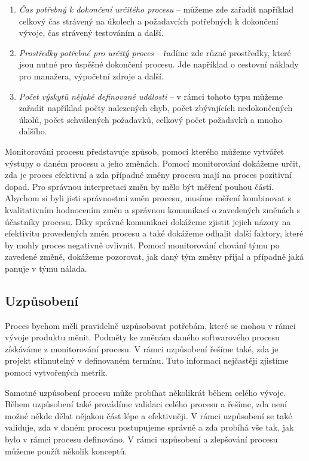 \documentclass[czech,master,public,dept460,male,cpdeclaration,oneside]{diploma}
\begin{document}
\begin{enumerate}
\item \textit{Čas potřebný k dokončení určitého procesu} -- můžeme zde zařadit například celkový čas strávený na úkolech a požadavcích potřebných k dokončení vývoje, čas strávený testováním a další.

\item \textit{Prostředky potřebné pro určitý proces} -- řadíme zde různé prostředky, které jsou nutné pro úspěšné dokončení procesu. Jde například o cestovní náklady pro manažera, výpočetní zdroje a další.

\item \textit{Počet výskytů nějaké definované události} -- v rámci tohoto typu můžeme zařadit například počty nalezených chyb, počet zbývajících nedokončených úkolů, počet schválených požadavků, celkový počet požadavků a mnoho dalšího.
\end{enumerate}

Monitorování procesu představuje způsob, pomocí kterého můžeme vytvářet výstupy o daném procesu a jeho změnách. Pomocí monitorování dokážeme určit, zda je proces efektivní a zda případné změny procesu mají na proces pozitivní dopad. Pro správnou interpretaci změn by mělo být měření pouhou částí. Abychom si byli jisti správnostmi změn procesu, musíme měření kombinovat s kvalitativním hodnocením změn a správnou komunikací o zavedených změnách s účastníky procesu. Díky správné komunikaci dokážeme zjistit jejich názory na efektivitu provedených změn procesu a také dokážeme odhalit další faktory, které by mohly proces negativně ovlivnit. Pomocí monitorování chování týmu po zavedené změně, dokážeme pozorovat, jak daný tým změny přijal a případně jaká panuje v týmu nálada.

\subsection{Uzpůsobení}
\label{sec:control}
Proces bychom měli pravidelně uzpůsobovat potřebám, které se mohou v rámci vývoje produktu měnit. Podměty ke změnám daného softwarového procesu získáváme z monitorování procesu. V rámci uzpůsobení řešíme také, zda je projekt stihnutelný v definovaném termínu. Tuto informaci nejčastěji zjistíme pomocí vytvořených metrik.

Samotné uzpůsobení procesu může probíhat několikrát během celého vývoje. Během uzpůsobení také provádíme validaci celého procesu a řešíme, zda není možné někde dělat nějakou část lépe a efektivněji. V rámci uzpůsobení se také validuje, zda v daném procesu postupujeme správně a zda probíhá vše tak, jak bylo v rámci procesu definováno. V rámci uzpůsobení a zlepšování procesu můžeme použít několik konceptů.
\end{document}

